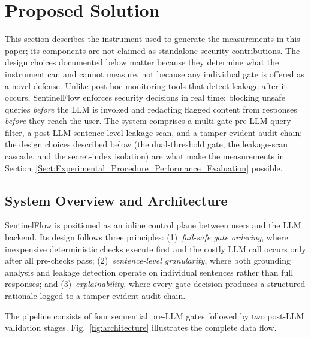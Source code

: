 \documentclass[journal]{IEEEtran}
\begin{document}
\section{Proposed Solution}
\label{Sect:Proposed_Solution}

This section describes the instrument used to generate the measurements in this paper; its components are not claimed as standalone security contributions. The design choices documented below matter because they determine what the instrument can and cannot measure, not because any individual gate is offered as a novel defense. Unlike post-hoc monitoring tools that detect leakage after it occurs, SentinelFlow enforces security decisions in real time: blocking unsafe queries \textit{before} the LLM is invoked and redacting flagged content from responses \textit{before} they reach the user. The system comprises a multi-gate pre-LLM query filter, a post-LLM sentence-level leakage scan, and a tamper-evident audit chain; the design choices described below (the dual-threshold gate, the leakage-scan cascade, and the secret-index isolation) are what make the measurements in Section~\ref{Sect:Experimental_Procedure_Performance_Evaluation} possible.


\subsection{System Overview and Architecture}
\label{Sect:System_Overview}

SentinelFlow is positioned as an inline control plane between users and the LLM backend. Its design follows three principles: (1)~\textit{fail-safe gate ordering}, where inexpensive deterministic checks execute first and the costly LLM call occurs only after all pre-checks pass; (2)~\textit{sentence-level granularity}, where both grounding analysis and leakage detection operate on individual sentences rather than full responses; and (3)~\textit{explainability}, where every gate decision produces a structured rationale logged to a tamper-evident audit chain.

The pipeline consists of four sequential pre-LLM gates followed by two post-LLM validation stages. Fig.~\ref{fig:architecture} illustrates the complete data flow.
\end{document}
